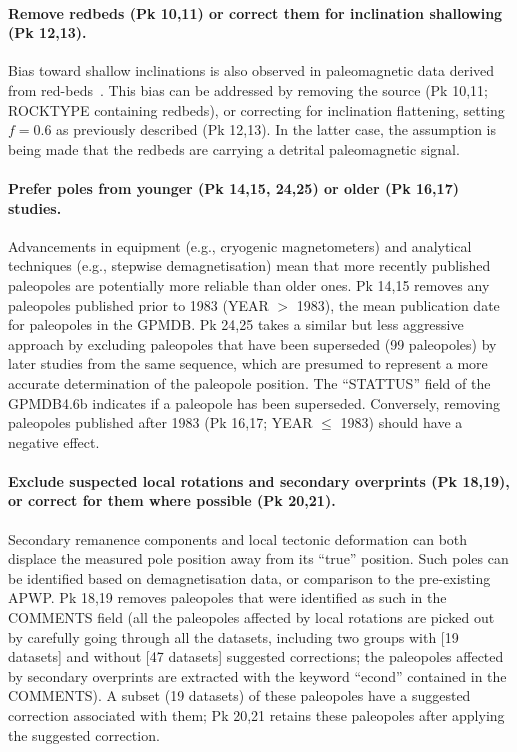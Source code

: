 \paragraph{Remove redbeds (Pk 10,11) or correct them for inclination
shallowing (Pk 12,13).} Bias toward shallow inclinations is also observed
in paleomagnetic data derived from red-beds~\cite[e.g., in central Asia,
Mediterranean region, North America, etc.]{T04,K04,T07,B10}. This bias can be
addressed by removing the source (Pk 10,11; ROCKTYPE containing redbeds), or
correcting for inclination flattening, setting $f=0.6$ as previously described
(Pk 12,13). In the latter case, the assumption is being made that the
redbeds are carrying a detrital paleomagnetic signal.

\paragraph{Prefer poles from younger (Pk 14,15, 24,25) or older (Pk 16,17)
studies.} Advancements in equipment (e.g., cryogenic magnetometers) and
analytical techniques (e.g., stepwise demagnetisation) mean that more recently
published paleopoles are potentially more reliable than older ones. Pk 14,15
removes any paleopoles published prior to 1983 (YEAR $>$ 1983), the mean
publication date for paleopoles in the GPMDB\@. Pk 24,25 takes a similar but
less aggressive approach by excluding paleopoles that have been superseded (99
paleopoles) by later studies from the same sequence, which are presumed to
represent a more accurate determination of the paleopole position. The
``STATTUS'' field of the GPMDB4.6b indicates if a paleopole has been superseded.
Conversely, removing paleopoles published after 1983 (Pk 16,17; YEAR $\leq$
1983) should have a negative effect.

\paragraph{Exclude suspected local rotations and secondary overprints (Pk
18,19), or correct for them where possible (Pk 20,21).} Secondary remanence
components and local tectonic deformation can both displace the measured pole
position away from its ``true'' position. Such poles can be identified based on
demagnetisation data, or comparison to the pre-existing APWP\@. Pk 18,19
removes paleopoles that were identified as such in the COMMENTS field (all the
paleopoles affected by local rotations are picked out by carefully going through
all the datasets, including two groups with [19 datasets] and without [47
datasets] suggested corrections; the paleopoles affected by secondary overprints
are extracted with the keyword ``econd'' contained in the COMMENTS). A subset
(19 datasets) of these paleopoles have a suggested correction associated with
them; Pk 20,21 retains these paleopoles after applying the suggested
correction.

